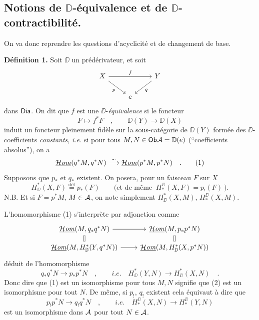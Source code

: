 \subsection*{Notions de $\mathbb{D}$-équivalence et de $\mathbb{D}$-contractibilité.}

On va donc reprendre les questions d'acyclicité et de changement de base.

\noindent\textbf{Définition 1.} Soit $\DD$ un prédérivateur, et soit
\[
\begin{tikzcd}
X \arrow[rr, "f"] \arrow[dr, "p"'] & & Y \arrow[dl, "q"] \\
& e &
\end{tikzcd}
\]
dans $\mathsf{Dia}$. On dit que $f$ est une $\DD$-\textit{équivalence} si le foncteur
\[
F \longmapsto f^*F \quad , \qquad \DD(Y) \longrightarrow \DD(X)
\]
induit un foncteur pleinement fidèle sur la sous-catégorie de $\DD(Y)$ formée des $\DD$-coefficients \textit{constants}, \textit{i.e.} si pour tous $M, N \in \mathsf{Ob} \mathcal{A} = \mathbb{D}(e)$ (“coefficients absolus”), on a
\[
\sHom(q^*M, q^*N) \isolongto \sHom(p^*M, p^*N) \quad . \tag*{(1)}
\]
Supposons que $p_*$ et $q_*$ existent. On posera, pour un faisceau $F$ sur $X$
\[
H^*_{\DD}(X, F) \overset{\text{déf}}{=} p_*(F) \qquad \text{(et de même } \ H^{\DD}_*(X, F) = p_!(F) \ \text{).}
\]
N.B. Et si $F = p^*M$, $M \in \mathcal{A}$, on note simplement $H^*_{\DD}(X, M)$, $H^{\DD}_*(X, M)$.

\noindent L'homomorphisme (1) s'interprète par adjonction comme
\[
\begin{tikzcd}[row sep=small]
\sHom(M, q_*q^*N) \arrow[r] \arrow[d, equal] & \sHom(M, p_*p^*N) \arrow[d, equal] \\
\sHom(M, H^*_{\DD}(Y, q^*N)) \arrow[r] & \sHom(M, H^*_{\DD}(X, p^*N))
\end{tikzcd}
\]
déduit de l'homomorphisme
\[
q_*q^*N \longrightarrow p_*p^*N \quad , \qquad \textit{i.e.} \quad H^*_{\DD}(Y, N) \longrightarrow H^*_{\DD}(X, N) \quad . \tag*{(2)}
\]
Donc dire que (1) est un isomorphisme pour tous $M, N$ signifie que (2) est un isomorphisme pour tout $N$. De même, si $p_!$, $q_!$ existent cela équivaut à dire que
\[
p_!p^*N \longrightarrow q_!q^*N \quad , \qquad \textit{i.e.} \quad H^{\DD}_*(X, N) \longrightarrow H^{\DD}_*(Y, N) \tag*{$(2')$}
\]
est un isomorphisme dans $\mathcal{A}$ pour tout $N \in \mathcal{A}$.

\clearpage
{}
\noindent{}

